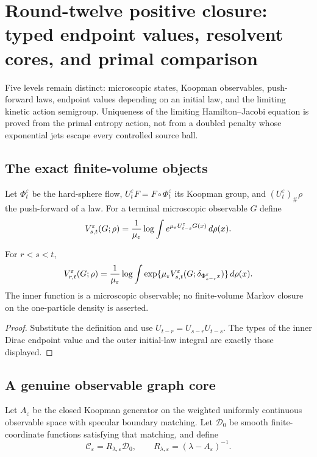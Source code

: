 \section{Round-twelve positive closure: typed endpoint values, resolvent cores, and primal comparison}
\label{sec:r12-b4}

Five levels remain distinct: microscopic states, Koopman observables,
push-forward laws, endpoint values depending on an initial law, and the
limiting kinetic action semigroup.  Uniqueness of the limiting Hamilton--Jacobi
equation is proved from the primal entropy action, not from a doubled penalty
whose exponential jets escape every controlled source ball.

\subsection{The exact finite-volume objects}

Let $\Phi_t^\varepsilon$ be the hard-sphere flow, $U_t^\varepsilon F=F\circ
\Phi_t^\varepsilon$ its Koopman group, and
$(U_t^\varepsilon)_\#\rho$ the push-forward of a law.  For a terminal
microscopic observable $G$ define
\[
 V_{s,t}^\varepsilon(G;\rho)
 ={1\over\mu_\varepsilon}\log
 \int e^{\mu_\varepsilon U_{t-s}^\varepsilon G(x)}\,d\rho(x).
\]

\begin{proposition}
\label{prop:r12-b4-tower}
For $r<s<t$,
\[
 V_{r,t}^\varepsilon(G;\rho)
 ={1\over\mu_\varepsilon}\log
 \int\exp\{\mu_\varepsilon
 V_{s,t}^\varepsilon(G;\delta_{\Phi_{s-r}^\varepsilon x})\}\,d\rho(x).
\]
The inner function is a microscopic observable; no finite-volume Markov
closure on the one-particle density is asserted.
\end{proposition}

\begin{proof}
Substitute the definition and use
$U_{t-r}=U_{s-r}U_{t-s}$.  The types of the inner Dirac endpoint value and the
outer initial-law integral are exactly those displayed.
\end{proof}

\subsection{A genuine observable graph core}

Let $A_\varepsilon$ be the closed Koopman generator on the weighted uniformly
continuous observable space with specular boundary matching.  Let
$\mathscr D_0$ be smooth finite-coordinate functions satisfying that matching,
and define
\[
 \mathscr C_\varepsilon=R_{\lambda,\varepsilon}\mathscr D_0,
 \qquad
 R_{\lambda,\varepsilon}=(\lambda-A_\varepsilon)^{-1}.
\]

